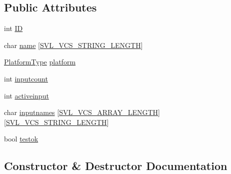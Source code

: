 \subsection*{Public Attributes}
\begin{DoxyCompactItemize}
\item 
int \hyperlink{classsvl_filter_source_video_capture_types_1_1_device_info_aaccc76356ec4856b0c32a2f39b273d91}{I\+D}
\item 
char \hyperlink{classsvl_filter_source_video_capture_types_1_1_device_info_ac561061543ebd968e2146173a06f43b2}{name} \mbox{[}\hyperlink{svl_definitions_8h_a37636885d94297a4d13180603ffd78aa}{S\+V\+L\+\_\+\+V\+C\+S\+\_\+\+S\+T\+R\+I\+N\+G\+\_\+\+L\+E\+N\+G\+T\+H}\mbox{]}
\item 
\hyperlink{namespacesvl_filter_source_video_capture_types_aa8ef2b6d9a414a8970cc722eaa37b32b}{Platform\+Type} \hyperlink{classsvl_filter_source_video_capture_types_1_1_device_info_a3ca50fbf0a92a94e6ec84d2c93f2bd31}{platform}
\item 
int \hyperlink{classsvl_filter_source_video_capture_types_1_1_device_info_ac9f5e91e2ceaaf2498f798782ca5ef1a}{inputcount}
\item 
int \hyperlink{classsvl_filter_source_video_capture_types_1_1_device_info_a85dd2a48ada88c84d81110709569b5d3}{activeinput}
\item 
char \hyperlink{classsvl_filter_source_video_capture_types_1_1_device_info_a23dde9ba710beb1adf9c1c12ecd85a9a}{inputnames} \mbox{[}\hyperlink{svl_definitions_8h_adc480737980c8fdc43de655dfd4f796f}{S\+V\+L\+\_\+\+V\+C\+S\+\_\+\+A\+R\+R\+A\+Y\+\_\+\+L\+E\+N\+G\+T\+H}\mbox{]}\mbox{[}\hyperlink{svl_definitions_8h_a37636885d94297a4d13180603ffd78aa}{S\+V\+L\+\_\+\+V\+C\+S\+\_\+\+S\+T\+R\+I\+N\+G\+\_\+\+L\+E\+N\+G\+T\+H}\mbox{]}
\item 
bool \hyperlink{classsvl_filter_source_video_capture_types_1_1_device_info_a1ccd6cfa9057071df17b79bac2624c23}{testok}
\end{DoxyCompactItemize}


\subsection{Constructor \& Destructor Documentation}
\hypertarget{classsvl_filter_source_video_capture_types_1_1_device_info_a478e99b5870a4edc8cea32852f3eb14e}{}
